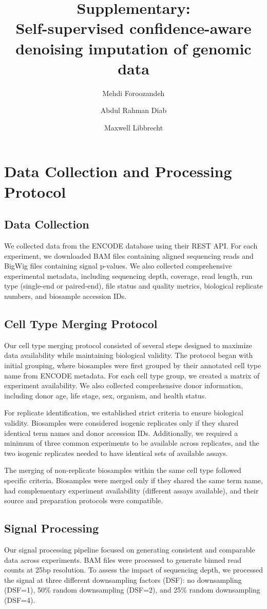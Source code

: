 \documentclass[a4paper, 11pt]{article}
\title{\textbf{Supplementary: \\}Self-supervised confidence-aware denoising imputation of genomic data}
\author[1]{\small Mehdi Foroozandeh}
\author[1]{Abdul Rahman Diab}
\author[1]{Maxwell Libbrecht}
\affil[1]{School of Computing Science, Simon Fraser University, Burnaby, Canada}
\date{}
\begin{document}
\maketitle
\section{Data Collection and Processing Protocol}

\subsection{Data Collection}
We collected data from the ENCODE database using their REST API. For each experiment, we downloaded BAM files containing aligned sequencing reads and BigWig files containing signal p-values. We also collected comprehensive experimental metadata, including sequencing depth, coverage, read length, run type (single-end or paired-end), file status and quality metrics, biological replicate numbers, and biosample accession IDs.

\subsection{Cell Type Merging Protocol}
Our cell type merging protocol consisted of several steps designed to maximize data availability while maintaining biological validity. The protocol began with initial grouping, where biosamples were first grouped by their annotated cell type name from ENCODE metadata. For each cell type group, we created a matrix of experiment availability. We also collected comprehensive donor information, including donor age, life stage, sex, organism, and health status.

For replicate identification, we established strict criteria to ensure biological validity. Biosamples were considered isogenic replicates only if they shared identical term names and donor accession IDs. Additionally, we required a minimum of three common experiments to be available across replicates, and the two isogenic replicates needed to have identical sets of available assays.

The merging of non-replicate biosamples within the same cell type followed specific criteria. Biosamples were merged only if they shared the same term name, had complementary experiment availability (different assays available), and their source and preparation protocols were compatible.

\subsection{Signal Processing}
Our signal processing pipeline focused on generating consistent and comparable data across experiments. BAM files were processed to generate binned read counts at 25bp resolution. To assess the impact of sequencing depth, we processed the signal at three different downsampling factors (DSF): no downsampling (DSF=1), 50\% random downsampling (DSF=2), and 25\% random downsampling (DSF=4).
\end{document}
